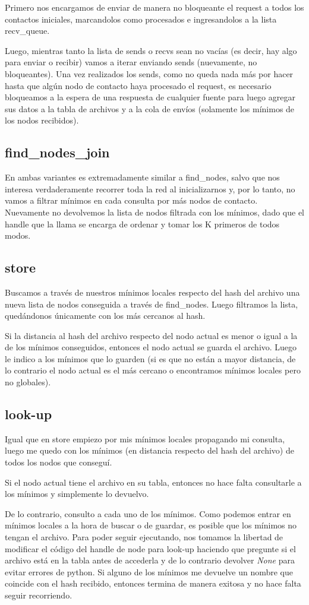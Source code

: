             Primero nos encargamos de enviar de manera no bloqueante el request a todos los contactos iniciales, marcandolos como procesados e ingresandolos a la lista recv\_queue.

            Luego, mientras tanto la lista de sends o recvs sean no vacías (es decir, hay algo para enviar o recibir) vamos a iterar enviando sends (nuevamente, no bloqueantes). Una vez realizados los sends, como no queda nada más por hacer hasta que algún nodo de contacto haya procesado el request, es necesario bloqueamos a la espera de una respuesta de cualquier fuente para luego agregar sus datos a la tabla de archivos y a la cola de envíos (solamente los mínimos de los nodos recibidos).

    \subsection{find\_nodes\_join}
            En ambas variantes es extremadamente similar a find\_nodes, salvo que nos interesa verdaderamente recorrer toda la red al inicializarnos y, por lo tanto, no vamos a filtrar mínimos en cada consulta por más nodos de contacto. Nuevamente no devolvemos la lista de nodos filtrada con los mínimos, dado que el handle que la llama se encarga de ordenar y tomar los K primeros de todos modos.

    \subsection{store}
            Buscamos a través de nuestros mínimos locales respecto del hash del archivo una nueva lista de nodos conseguida a través de find\_nodes. Luego filtramos la lista, quedándonos únicamente con los más cercanos al hash.

            Si la distancia al hash del archivo respecto del nodo actual es menor o igual a la de los mínimos conseguidos, entonces el nodo actual se guarda el archivo. Luego le indico a los mínimos que lo guarden (si es que no están a mayor distancia, de lo contrario el nodo actual es el más cercano o encontramos mínimos locales pero no globales).
    \subsection{look-up}
            Igual que en store empiezo por mis mínimos locales propagando mi consulta, luego me quedo con los mínimos (en distancia respecto del hash del archivo) de todos los nodos que conseguí.

            Si el nodo actual tiene el archivo en su tabla, entonces no hace falta consultarle a los mínimos y simplemente lo devuelvo.

            De lo contrario, consulto a cada uno de los mínimos. Como podemos entrar en mínimos locales a la hora de buscar o de guardar, es posible que los mínimos no tengan el archivo. Para poder seguir ejecutando, nos tomamos la libertad de modificar el código del handle de node para look-up haciendo que pregunte si el archivo está en la tabla antes de accederla y de lo contrario devolver \emph{None} para evitar errores de python. Si alguno de los mínimos me devuelve un nombre que coincide con el hash recibido, entonces termina de manera exitosa y no hace falta seguir recorriendo.
